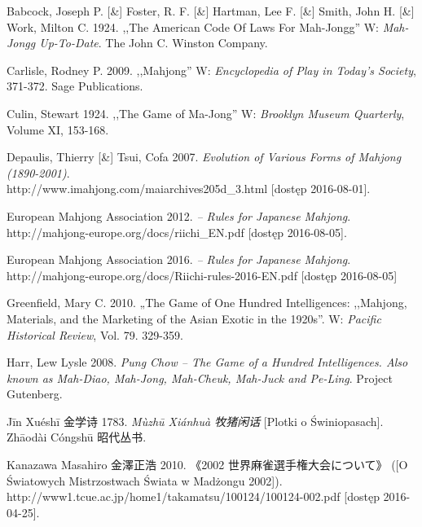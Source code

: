 \onecolumn
\biblio
\setlength{\parindent}{0pt}
\setlength{\parskip}{1ex plus 0.5ex minus 0.2ex}
Babcock, Joseph P. [\&] Foster, R. F. [\&] Hartman, Lee F. [\&] Smith, John H.
[\&] Work, Milton C. 1924. ,,The American Code Of Laws For Mah-Jongg'' W:
\textit{Mah-Jongg Up-To-Date}. The John C. Winston Company. 


Carlisle, Rodney P. 2009. ,,Mahjong'' W: \textit{Encyclopedia of Play in Today's
Society}, 371-372.
Sage Publications.

Culin, Stewart 1924. ,,The Game of Ma-Jong'' W: \textit{Brooklyn Museum
Quarterly}, Volume XI, 153-168.

Depaulis, Thierry [\&] Tsui, Cofa 2007. \textit{Evolution of Various Forms of
Mahjong (1890-2001)}. 
\\http://www.imahjong.com/maiarchives205d\_3.html [dostęp
2016-08-01].

European Mahjong Association 2012. \textit{ -- Rules for Japanese Mahjong}.
\\http://mahjong-europe.org/docs/riichi\_EN.pdf [dostęp 2016-08-05].

European Mahjong Association 2016. \textit{ -- Rules for Japanese Mahjong}.
\\http://mahjong-europe.org/docs/Riichi-rules-2016-EN.pdf [dostęp 2016-08-05]

Greenfield, Mary C. 2010. „The Game of One Hundred Intelligences: ,,Mahjong,
Materials, and the Marketing of the Asian Exotic in the 1920s''. W:
\textit{Pacific Historical Review}, Vol. 79. 329-359.

Harr, Lew Lysle 2008. \textit{Pung Chow -- The Game of a Hundred Intelligences.
Also known as Mah-Diao, Mah-Jong, Mah-Cheuk, Mah-Juck and Pe-Ling}. Project
Gutenberg.

Jīn Xuéshī 金学诗 1783. \textit{Mùzhū Xiánhuà 牧猪闲话} [Plotki o Świniopasach].
Zhāodài Cóngshū 昭代丛书.

Kanazawa Masahiro 金澤正浩 2010.  《2002 世界麻雀選手権大会について》 ([O Światowych Mistrzostwach
Świata w Madżongu 2002]).
\\http://www1.tcue.ac.jp/home1/takamatsu/100124/100124-002.pdf [dostęp
2016-04-25].


